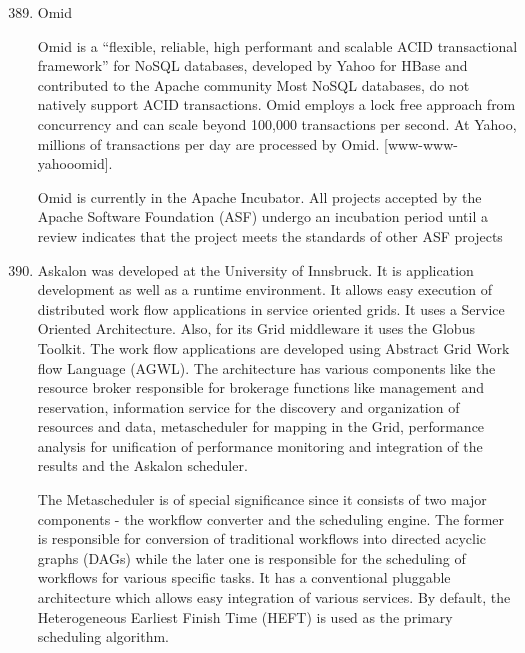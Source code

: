 \begin{enumerate}
\setcounter{enumi}{388}
\item {} 
Omid

Omid is a ``flexible, reliable, high performant and scalable ACID
transactional framework'' \label{\detokenize{i524/technologies:id713}}{\hyperref[\detokenize{i524/technologies:www-apacheomid}]{\sphinxcrossref{{[}623{]}}}} for NoSQL databases,
developed by Yahoo for HBase and contributed to the Apache
community  Most NoSQL databases, do not natively support ACID
transactions. Omid employs a lock free approach from concurrency
and can scale beyond 100,000 transactions per second. At Yahoo,
millions of transactions per day are processed by Omid.
{[}www-www-yahooomid{]}.

Omid is currently in the Apache Incubator.  All projects accepted
by the Apache Software Foundation (ASF) undergo an incubation
period until a review indicates that the project meets the
standards of other ASF projects \label{\detokenize{i524/technologies:id715}}{\hyperref[\detokenize{i524/technologies:www-apacheincubator}]{\sphinxcrossref{{[}190{]}}}}

\item {} 
\label{\detokenize{i524/technologies:id716}}{\hyperref[\detokenize{i524/technologies:rmbdp-book}]{\sphinxcrossref{{[}624{]}}}} Askalon was developed at the University of
Innsbruck.  It is application development as well as a runtime
environment. It allows easy execution of distributed work flow
applications in service oriented grids. It uses a Service
Oriented Architecture. Also, for its Grid middleware it uses the
Globus Toolkit. The work flow applications are developed using
Abstract Grid Work flow Language (AGWL). The architecture has
various components like the resource broker responsible for
brokerage functions like management and reservation, information
service for the discovery and organization of resources and data,
metascheduler for mapping in the Grid, performance analysis for
unification of performance monitoring and integration of the
results and the Askalon scheduler.

The Metascheduler is of special significance since it consists of
two major components - the workflow converter and the scheduling
engine. The former is responsible for conversion of traditional
workflows into directed acyclic graphs (DAGs) while the later one is
responsible for the scheduling of workflows for various specific
tasks. It has a conventional pluggable architecture which allows easy
integration of various services. By default, the Heterogeneous
Earliest Finish Time (HEFT) is used as the primary scheduling
algorithm.


\end{enumerate}
